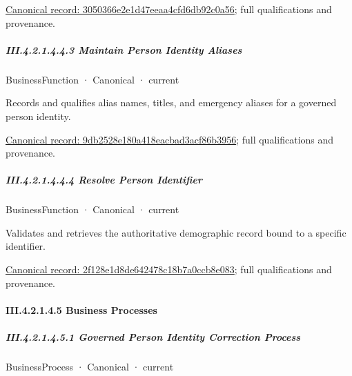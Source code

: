 {\footnotesize \href{../../../../continuum/business/business-function/3050366e2e1d47eeaa4cfd6db92c0a56.md}{Canonical record: 3050366e2e1d47eeaa4cfd6db92c0a56}; full qualifications and provenance.}\par
\subparagraph*{III.4.2.1.4.4.3 Maintain Person Identity Aliases}
\label{navigation:III.4.2.1.4.4.3}

\label{element:9db2528e180a418eacbad3acf86b3956}
{\small BusinessFunction · Canonical · current}\par

Records and qualifies alias names, titles, and emergency aliases for a governed person identity.


{\footnotesize \href{../../../../continuum/business/business-function/9db2528e180a418eacbad3acf86b3956.md}{Canonical record: 9db2528e180a418eacbad3acf86b3956}; full qualifications and provenance.}\par
\subparagraph*{III.4.2.1.4.4.4 Resolve Person Identifier}
\label{navigation:III.4.2.1.4.4.4}

\label{element:2f128e1d8de642478c18b7a0ccb8e083}
{\small BusinessFunction · Canonical · current}\par

Validates and retrieves the authoritative demographic record bound to a specific identifier.


{\footnotesize \href{../../../../continuum/business/business-function/2f128e1d8de642478c18b7a0ccb8e083.md}{Canonical record: 2f128e1d8de642478c18b7a0ccb8e083}; full qualifications and provenance.}\par
\paragraph*{III.4.2.1.4.5 Business Processes}
\label{navigation:III.4.2.1.4.5}

\subparagraph*{III.4.2.1.4.5.1 Governed Person Identity Correction Process}
\label{navigation:III.4.2.1.4.5.1}

\label{element:72f3c63da45d44868579a3bb15d1568c}
{\small BusinessProcess · Canonical · current}\par

